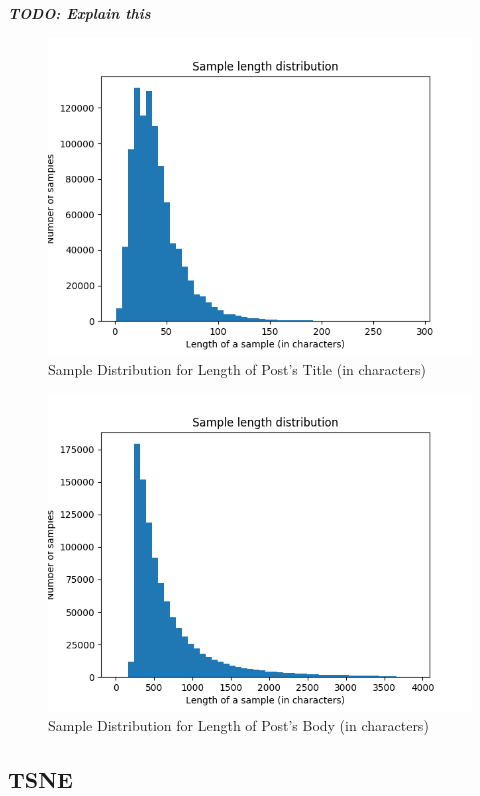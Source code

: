 \documentclass{sig-alternate-05-2015}
\begin{document}
\textit{\textbf{TODO: Explain this }}

\begin{figure}[H]
\centering
\includegraphics[width=\linewidth]{plots/sample-length-distribution-title-1000000.png}
\caption{Sample Distribution for Length of Post's Title (in characters)}
\end{figure}

\begin{figure}[H]
\centering
\includegraphics[width=\linewidth]{plots/sample-length-distribution-selftext-1000000.png}
\caption{Sample Distribution for Length of Post's Body (in characters)}
\end{figure}

\subsection{TSNE} 
\end{document}
